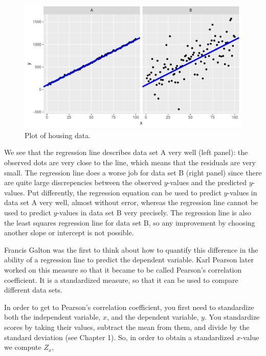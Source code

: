 \documentclass[]{report}\usepackage[]{graphicx}\usepackage[]{color}
\makeatletter
\def\maxwidth{ %
  \ifdim\Gin@nat@width>\linewidth
    \linewidth
  \else
    \Gin@nat@width
  \fi
}
\newenvironment{knitrout}{}{} %
\makeatother
\begin{document}
\begin{knitrout}
\color{fgcolor}\begin{figure}

{\centering \includegraphics[width=\maxwidth]{figure/lm_18-1} 

}

\caption[Plot of housing data]{Plot of housing data.}\label{fig:lm_18}
\end{figure}


\end{knitrout}


We see that the regression line describes data set A very well (left panel): the observed dots are very close to the line, which means that the residuals are very small. The regression line does a worse job for data set B (right panel) since there are quite large discrepencies between the observed $y$-values and the predicted $y$-values. Put differently, the regression equation can be used to predict $y$-values in data set A very well, almost without error, whereas the regression line cannot be used to predict $y$-values in data set B very precisely. The regression line is also the least squares regression line for data set B, so any improvement by choosing another slope or intercept is not possible.

Francis Galton was the first to think about how to quantify this difference in the ability of a regression line to predict the dependent variable. Karl Pearson later worked on this measure so that it became to be called Pearson's correlation coefficient. It is a standardized measure, so that it can be used to compare different data sets.

In order to get to Pearson's correlation coefficient, you first need to standardize both the independent variable, $x$, and the dependent variable, $y$. You standardize scores by taking their values, subtract the mean from them, and divide by the standard deviation (see Chapter 1). So, in order to obtain a standardized $x$-value we compute $Z_x$,
\end{document}
